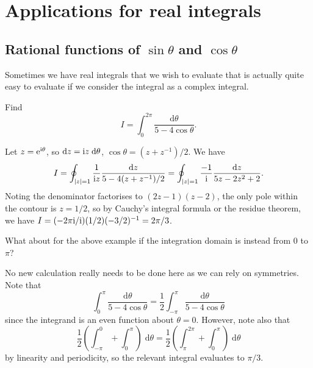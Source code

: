 \documentclass[letter-paper]{tufte-book}
\newenvironment{example}[1][Example]{\begin{trivlist}
\item[\hskip \labelsep {\bfseries #1}]}{\end{trivlist}}
\newcommand{\ex}{\mathrm{e}}
\newcommand{\zi}{{\rm i}}
\begin{document}

\section{Applications for real integrals}

\subsection{Rational functions of $\sin\theta$ and $\cos\theta$}

Sometimes we have real integrals that we wish to evaluate that is actually quite
easy to evaluate if we consider the integral as a complex integral.

\begin{example}
  Find
  \begin{equation*}
    I = \int_0^{2\pi} \frac{\mathrm{d}\theta}{5 - 4 \cos\theta}.
  \end{equation*}
  
  Let $z=\ex^{\zi \theta}$, so $\mathrm{d}z=\zi z\; \mathrm{d}\theta$,
  $\cos\theta = (z+z^{-1})/2$. We have
  \begin{equation*}
    I = \oint_{|z|=1} \frac{1}{\zi z} \frac{\mathrm{d}z}{5 - 4(z+z^{-1})/2} = \oint_{|z|=1}\frac{-1}{\zi} \frac{\mathrm{d}z}{5z - 2z^2 + 2}.
  \end{equation*}
  Noting the denominator factorises to $(2z-1)(z-2)$, the only pole within the
  contour is $z=1/2$, so by Cauchy's integral formula or the residue theorem, we
  have $I = (-2\pi \zi/\zi)(1/2)(-3/2)^{-1} = 2\pi/3$.
\end{example}

\begin{example}
  What about for the above example if the integration domain is instead from $0$
  to $\pi$?
  
  No new calculation really needs to be done here as we can rely on symmetries.
  Note that
  \begin{equation*}
    \int_0^{\pi} \frac{\mathrm{d}\theta}{5 - 4 \cos\theta} = \frac{1}{2}\int_{-\pi}^{\pi} \frac{\mathrm{d}\theta}{5 - 4 \cos\theta}
  \end{equation*}
  since the integrand is an even function about $\theta=0$. However, note also
  that
  \begin{equation*}
    \frac{1}{2}\left(\int^0_{-\pi} + \int^\pi_0\right)\; \mathrm{d}\theta = \frac{1}{2}\left(\int^{2\pi}_\pi + \int^\pi_0\right)\; \mathrm{d}\theta
  \end{equation*}
  by linearity and periodicity, so the relevant integral evaluates to $\pi/3$.
\end{example}
\end{document}
